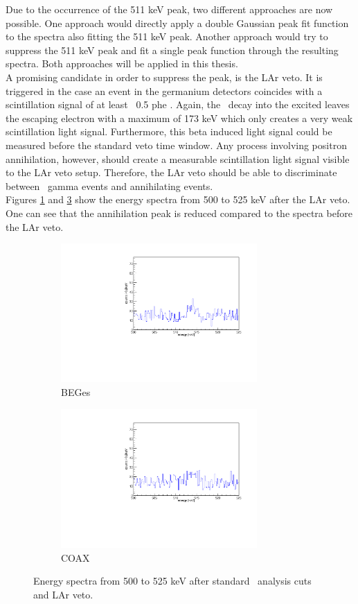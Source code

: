 \documentclass[encoding=utf8,british]{tumphthesis}
\begin{document}
Due to the occurrence of the 511 keV peak, two different approaches are now possible.
One approach would directly apply a double Gaussian peak fit function to the spectra also fitting the 511 keV peak.
Another approach would try to suppress the 511 keV peak and fit a single peak function through the resulting spectra.
Both approaches will be applied in this thesis.
\\

A promising candidate in order to suppress the peak, is the LAr veto.
It is triggered in the case an event in the germanium detectors coincides with a scintillation signal of at least ~0.5 phe \cite{agostini_background_2017}.
Again, the \Kr\ decay into the excited  leaves the escaping electron with a maximum of 173 keV which only creates a very weak scintillation light signal.
Furthermore, this beta induced light signal could be measured before the standard veto time window.
Any process involving positron annihilation, however, should create a measurable scintillation light signal visible to the LAr veto setup.
Therefore, the LAr veto should be able to discriminate between \Kr\ gamma events and annihilating events.
\\

Figures \ref{fig:LArBEGes} and \ref{fig:LArCOAX} show the energy spectra from 500 to 525 keV after the LAr veto.
One can see that the annihilation peak is reduced compared to the spectra before the LAr veto.
\\

\begin{figure}[t!]
\centering
\begin{subfigure}{0.475\textwidth}
	\includegraphics[width=75mm]{./Bilder/500525LArVetoBEGes.pdf}
    \caption{BEGes}
  \label{fig:LArBEGes}
\end{subfigure}\hfill%
\begin{subfigure}{0.475\textwidth}
	\includegraphics[width=75mm]{./Bilder/500525LArVetoCOAX.pdf}
  \caption{COAX}
  \label{fig:LArCOAX}
\end{subfigure}
    \caption{Energy spectra from 500 to 525 keV after standard \gerda\ analysis cuts and LAr veto.}
\end{figure}
\end{document}

